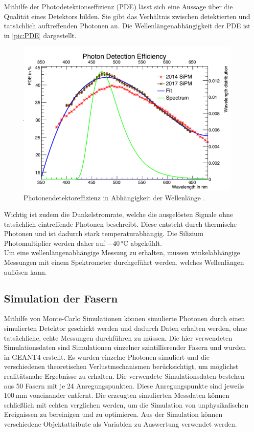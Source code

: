 Mithilfe der Photodetektionseffizienz (PDE) lässt sich eine Aussage über die Qualität eines Detektors bilden. Sie gibt das Verhältnis zwischen 
detektierten und tatsächlich auftreffenden Photonen an. Die Wellenlängenabhängigkeit der PDE ist in \autoref{pic:PDE} dargestellt.\\

\begin{figure}
    \centering
    \includegraphics[width = .8\textwidth]{content/pics/PDE.png}
    \caption{Photonendetektoreffizienz in Abhängigkeit der Wellenlänge \cite{SciFi_Versuch}.}
    \label{pic:PDE}
\end{figure}

Wichtig ist zudem die Dunkelstromrate, welche die ausgelösten Signale ohne tatsächlich eintreffende Photonen beschreibt. Diese entsteht durch
thermische Photonen und ist dadurch stark temperaturabhängig. Die Silizium Photomultiplier werden daher auf $-40 \, ° \mathrm{C}$ abgekühlt.\\
Um eine wellenlängenabhängige Messung zu erhalten, müssen winkelabhängige Messungen mit einem Spektrometer durchgeführt werden, welches Wellenlängen auflösen kann.

\subsection{Simulation der Fasern}

Mithilfe von Monte-Carlo Simulationen können simulierte Photonen durch einen simulierten Detektor geschickt werden und dadurch Daten erhalten
werden, ohne tatsächliche, echte Messungen durchführen zu müssen. Die hier verwendeten Simulationsdaten sind Simulationen einzelner szintillierender
Fasern und wurden in GEANT4 erstellt. Es wurden einzelne Photonen simuliert und die verschiedenen theoretischen Verlustmechanismen berücksichtigt,
um möglichst realitätsnahe Ergebnisse zu erhalten. Die verwendete Simulationsdaten bestehen aus 50 Fasern mit je 24 Anregungspunkten. Diese
Anregungspunkte sind jeweils $\qty{100}{\milli\metre}$ voneinander entfernt. Die erzeugten simulierten Messdaten können schließlich mit echten 
verglichen werden, um die Simulation von unphysikalischen Ereignissen zu bereinigen und zu optimieren. Aus der Simulation können verschiedene Objektattribute
als Variablen zu Auswertung verwendet werden.